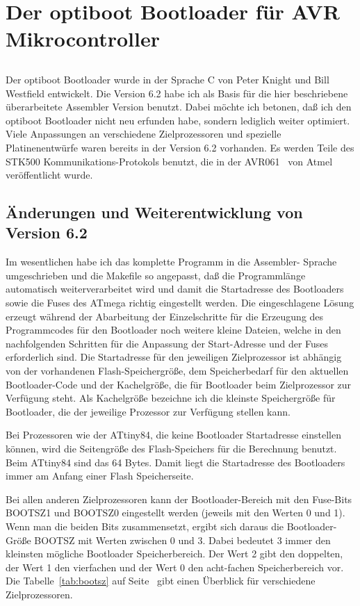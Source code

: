 \chapter{Der optiboot Bootloader für AVR Mikrocontroller}

\section*{}
Der optiboot Bootloader wurde in der Sprache C von Peter Knight und
Bill Westfield entwickelt. Die Version 6.2 habe ich als Basis
für die hier beschriebene überarbeitete Assembler Version benutzt.
Dabei möchte ich betonen, daß ich den optiboot Bootloader nicht
neu erfunden habe, sondern lediglich weiter optimiert. 
Viele Anpassungen an verschiedene Zielprozessoren und spezielle
Platinenentwürfe waren bereits in der Version 6.2 vorhanden.
Es werden Teile des STK500 Kommunikations-Protokols benutzt,
die in der AVR061~\cite{stk500} von Atmel veröffentlicht wurde.


\section{Änderungen und Weiterentwicklung von Version 6.2}
Im wesentlichen habe ich das komplette Programm in die Assembler-
Sprache umgeschrieben und die Makefile so angepasst, daß die Programmlänge
automatisch weiterverarbeitet wird und damit die Startadresse
des Bootloaders sowie die Fuses des ATmega richtig eingestellt werden.
Die eingeschlagene Lösung erzeugt während der Abarbeitung der Einzelschritte
für die Erzeugung des Programmcodes für den Bootloader noch weitere
kleine Dateien, welche in den nachfolgenden Schritten für die Anpassung
der Start-Adresse und der Fuses erforderlich sind.
Die Startadresse für den jeweiligen Zielprozessor ist abhängig von
der vorhandenen Flash-Speichergröße,
dem Speicherbedarf für den aktuellen Bootloader-Code und
der Kachelgröße, die für Bootloader beim Zielprozessor zur Verfügung steht.
Als Kachelgröße bezeichne ich die kleinste Speichergröße für Bootloader,
die der jeweilige Prozessor zur Verfügung stellen kann.


Bei Prozessoren wie der ATtiny84, die keine Bootloader Startadresse einstellen können,
wird die Seitengröße des Flash-Speichers für die Berechnung benutzt.
Beim ATtiny84 sind das 64 Bytes. Damit liegt die Startadresse des Bootloaders immer
am Anfang einer Flash Speicherseite. 

Bei allen anderen Zielprozessoren kann der Bootloader-Bereich mit den
Fuse-Bits BOOTSZ1 und BOOTSZ0 eingestellt werden (jeweils mit den Werten 0 und 1).
Wenn man die beiden Bits zusammensetzt, ergibt sich daraus die
Bootloader-Größe BOOTSZ mit Werten zwischen 0 und 3.
Dabei bedeutet 3 immer den kleinsten mögliche Bootloader Speicherbereich.
Der Wert 2 gibt den doppelten, der Wert 1 den vierfachen und
der Wert 0 den acht-fachen Speicherbereich vor.
Die Tabelle~\ref{tab:bootsz} auf Seite~\pageref{tab:bootsz} gibt einen
Überblick für verschiedene Zielprozessoren.

